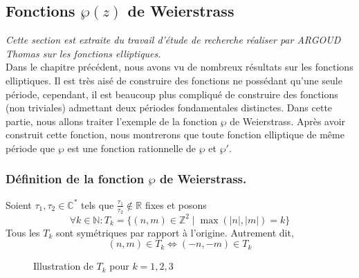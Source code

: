 \documentclass[12pt]{article}
\begin{document}
    \subsection{Fonctions $\wp(z)$ de Weierstrass}
    \textit{Cette section est extraite du travail d'étude de recherche réaliser par ARGOUD Thomas  sur les fonctions elliptiques.} \\
    Dans le chapitre précédent, nous avons vu de nombreux résultats sur les fonctions elliptiques. Il est très aisé de construire des fonctions ne possédant qu'une seule période, cependant, il est beaucoup plus compliqué de construire des fonctions (non triviales) admettant deux périodes fondamentales distinctes. Dans cette partie, nous allons traiter l'exemple de la fonction $\wp$ de Weierstrass. Après avoir construit cette fonction, nous montrerons que toute fonction elliptique de même période que $\wp$ est une fonction rationnelle de $\wp$ et $\wp'$.

    \subsubsection{Définition de la fonction $\wp$ de Weierstrass.}

    Soient $\tau_1, \tau_2 \in \mathbb{C}^*$ tels que $\frac{\tau_1}{\tau_2} \notin \mathbb{R}$ fixes et posons
    \[
    \forall k \in \mathbb{N} : T_k = \{(n,m) \in \mathbb{Z}^2 \mid \max(|n|,|m|) = k\}
    \]
    Tous les $T_k$ sont symétriques par rapport à l'origine. Autrement dit,
    \[
    (n,m) \in T_k \iff (-n,-m) \in T_k
    \]

    \begin{figure}[h]
        \centering
        \caption{Illustration de \( T_k \) pour \( k=1,2,3 \)}
        \label{fig:Tk}
    \end{figure}
\end{document}
